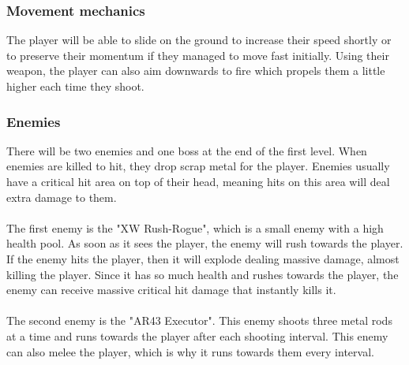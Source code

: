 \documentclass[../Main.tex]{subfiles}
\begin{document}
\subsubsection{Movement mechanics}

The player will be able to slide on the ground to increase their speed shortly or to preserve their momentum if they managed to move fast initially. Using their weapon, the player can also aim downwards to fire which propels them a little higher each time they shoot.

\subsubsection{Enemies}

There will be two enemies and one boss at the end of the first level. When enemies are killed to hit, they drop scrap metal for the player. Enemies usually have a critical hit area on top of their head, meaning hits on this area will deal extra damage to them. 

\paragraph{}
The first enemy is the "XW Rush-Rogue", which is a small enemy with a high health pool. As soon as it sees the player, the enemy will rush towards the player. If the enemy hits the player, then it will explode dealing massive damage, almost killing the player. Since it has so much health and rushes towards the player, the enemy can receive massive critical hit damage that instantly kills it.

\paragraph{}
The second enemy is the "AR43 Executor". This enemy shoots three metal rods at a time and runs towards the player after each shooting interval. This enemy can also melee the player, which is why it runs towards them every interval.

\paragraph{}
\end{document}
